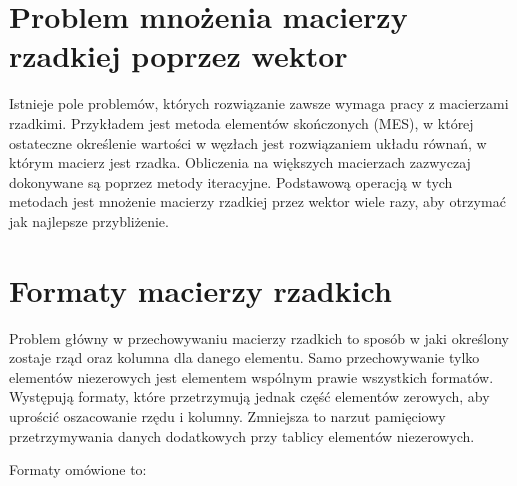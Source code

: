 \section{Problem mnożenia macierzy rzadkiej poprzez wektor}
\label{sec:macierzrzadkawektor}

Istnieje pole problemów, których rozwiązanie zawsze wymaga pracy z macierzami rzadkimi.
Przykładem jest metoda elementów skończonych (MES), w której ostateczne określenie wartości w węzłach jest rozwiązaniem układu równań, w którym macierz jest rzadka.
Obliczenia na większych macierzach zazwyczaj dokonywane są poprzez metody iteracyjne.
Podstawową operacją w tych metodach jest mnożenie macierzy rzadkiej przez wektor wiele razy, aby otrzymać jak najlepsze przybliżenie.

\section{Formaty macierzy rzadkich}
\label{sec:formatymacierzy}

Problem główny w przechowywaniu macierzy rzadkich to sposób w jaki określony zostaje rząd oraz kolumna dla danego elementu.
Samo przechowywanie tylko elementów niezerowych jest elementem wspólnym prawie wszystkich formatów.
Występują formaty, które przetrzymują jednak część elementów zerowych, aby uprościć oszacowanie rzędu i kolumny.
Zmniejsza to narzut pamięciowy przetrzymywania danych dodatkowych przy tablicy elementów niezerowych.

Formaty omówione to:

